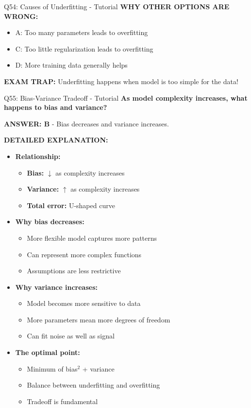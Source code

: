 \documentclass[8pt]{beamer}
\begin{document}
\begin{frame}{Q54: Causes of Underfitting - Tutorial}
		\vspace{0.05cm}
		\textcolor{myred}{\textbf{WHY OTHER OPTIONS ARE WRONG:}}
		\begin{itemize}
			\item \textcolor{myred}{A:} Too many parameters leads to overfitting
			\item \textcolor{myred}{C:} Too little regularization leads to overfitting
			\item \textcolor{myred}{D:} More training data generally helps
		\end{itemize}
		
		\textcolor{myred}{\textbf{EXAM TRAP:}} Underfitting happens when model is too simple for the data!
	\end{frame}
	
	\begin{frame}{Q55: Bias-Variance Tradeoff - Tutorial}
		\fontsize{6.5}{7.5}\selectfont
		\textbf{As model complexity increases, what happens to bias and variance?}
		
		\vspace{0.05cm}
		\textcolor{myblue}{\textbf{ANSWER: B}} - Bias decreases and variance increases.
		
		\vspace{0.05cm}
		\textbf{DETAILED EXPLANATION:}
		\begin{itemize}
			\item \textbf{Relationship:}
			\begin{itemize}
				\item \textbf{Bias:} $\downarrow$ as complexity increases
				\item \textbf{Variance:} $\uparrow$ as complexity increases
				\item \textbf{Total error:} U-shaped curve
			\end{itemize}
			\item \textbf{Why bias decreases:}
			\begin{itemize}
				\item More flexible model captures more patterns
				\item Can represent more complex functions
				\item Assumptions are less restrictive
			\end{itemize}
			\item \textbf{Why variance increases:}
			\begin{itemize}
				\item Model becomes more sensitive to data
				\item More parameters mean more degrees of freedom
				\item Can fit noise as well as signal
			\end{itemize}
			\item \textbf{The optimal point:}
			\begin{itemize}
				\item Minimum of bias$^2$ + variance
				\item Balance between underfitting and overfitting
				\item Tradeoff is fundamental
			\end{itemize}
		\end{itemize}
		

\end{frame}
\end{document}
